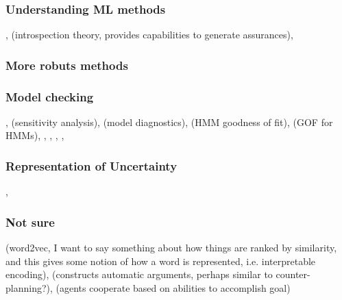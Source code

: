\subsubsection{Understanding ML methods} \cite{Bakry2015-td}, \cite{Konolige1985-vx} (introspection theory, provides capabilities to generate assurances),  
\subsubsection{More robuts methods} \cite{Bashivan2015-fc}
\subsubsection{Model checking} \cite{Titman2008-ct}, \cite{Laskey1995-jp} (sensitivity analysis), \cite{Sinharay2006-yc} (model diagnostics), \cite{Titman2012-zw} (HMM goodness of fit), \cite{MacKay_Altman2004-fl} (GOF for HMMs), \cite{Dannemann2008-ch}, \cite{Titman2010-qx}, \cite{Johnson2004-mv}, \cite{Yuan2012-tb}, \cite{Spiegelhalter2002-ia}
\subsubsection{Representation of Uncertainty} \cite{Laskey2015-gz}, \cite{Costa2012-fa}

\subsubsection{Not sure} \cite{Mikolov2013-lt}(word2vec, I want to say something about how things are ranked by similarity, and this gives some notion of how a word is represented, i.e. interpretable encoding), \cite{Gutfreund2016-xe} (constructs automatic arguments, perhaps similar to counter-planning?), \cite{Charif2013-vo} (agents cooperate based on abilities to accomplish goal)
